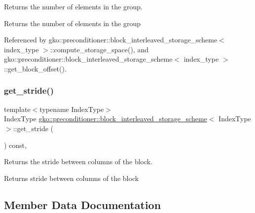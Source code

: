 Returns the number of elements in the group. 

\begin{DoxyReturn}{Returns}
the number of elements in the group 
\end{DoxyReturn}


Referenced by gko\+::preconditioner\+::block\+\_\+interleaved\+\_\+storage\+\_\+scheme$<$ index\+\_\+type $>$\+::compute\+\_\+storage\+\_\+space(), and gko\+::preconditioner\+::block\+\_\+interleaved\+\_\+storage\+\_\+scheme$<$ index\+\_\+type $>$\+::get\+\_\+block\+\_\+offset().

\mbox{\label{structgko_1_1preconditioner_1_1block__interleaved__storage__scheme_aa07119fbf99fae71b1f9c4f693e14ce4}} 
\subsubsection{\texorpdfstring{get\+\_\+stride()}{get\_stride()}}
{\footnotesize\ttfamily template$<$typename Index\+Type$>$ \\
Index\+Type \hyperlink{structgko_1_1preconditioner_1_1block__interleaved__storage__scheme}{gko\+::preconditioner\+::block\+\_\+interleaved\+\_\+storage\+\_\+scheme}$<$ Index\+Type $>$\+::get\+\_\+stride (\begin{DoxyParamCaption}{ }\end{DoxyParamCaption}) const\hspace{0.3cm}{\ttfamily [inline]}, {\ttfamily [noexcept]}}



Returns the stride between columns of the block. 

\begin{DoxyReturn}{Returns}
stride between columns of the block 
\end{DoxyReturn}


\subsection{Member Data Documentation}
\mbox{\label{structgko_1_1preconditioner_1_1block__interleaved__storage__scheme_a8fa279f4178c767bdbf52ef4d7e23ad1}} 
